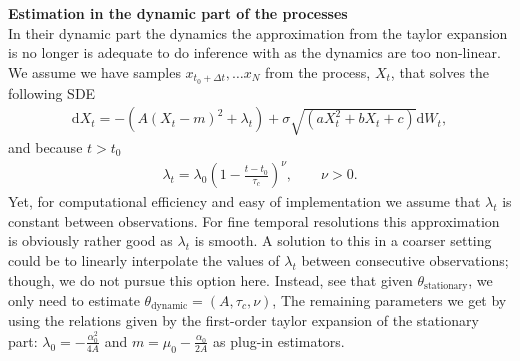 \textbf{Estimation in the dynamic part of the processes}\\
In their dynamic part the dynamics the approximation from the taylor expansion is no longer is adequate to do inference with as the dynamics are too non-linear. We assume we have samples $x_{t_0+\Delta t}, \dots x_{N}$ from the process, $X_t$, that solves the following SDE
\begin{align}
    \mathrm{d}X_t = -\left(A(X_t - m)^2 + \lambda_t\right) + \sigma\sqrt{\left(aX_t^2 + bX_t + c\right)}\mathrm{d}W_t, 
\end{align}
and because $t>t_0$
\begin{align}
    \lambda_t = \lambda_0\left(1 - \frac{t - t_0}{\tau_c}\right)^\nu, \qquad \nu >0.
\end{align} 
Yet, for computational efficiency and easy of implementation we assume that $\lambda_t$ is constant between observations. For fine temporal resolutions this approximation is obviously rather good as $\lambda_t$ is smooth. A solution to this in a coarser setting could be to linearly interpolate the values of $\lambda_t$ between consecutive observations; though, we do not pursue this option here. Instead, see that given $\theta_{\mathrm{stationary}}$, we only need to estimate $\theta_{\mathrm{dynamic}} = (A, \tau_c, \nu)$, The remaining parameters we get by using the relations given by the first-order taylor expansion of the stationary part: $\lambda_0 = -\frac{\alpha_0^2}{4A}$ and $m = \mu_0 - \frac{\alpha_0}{2A}$ as plug-in estimators.

